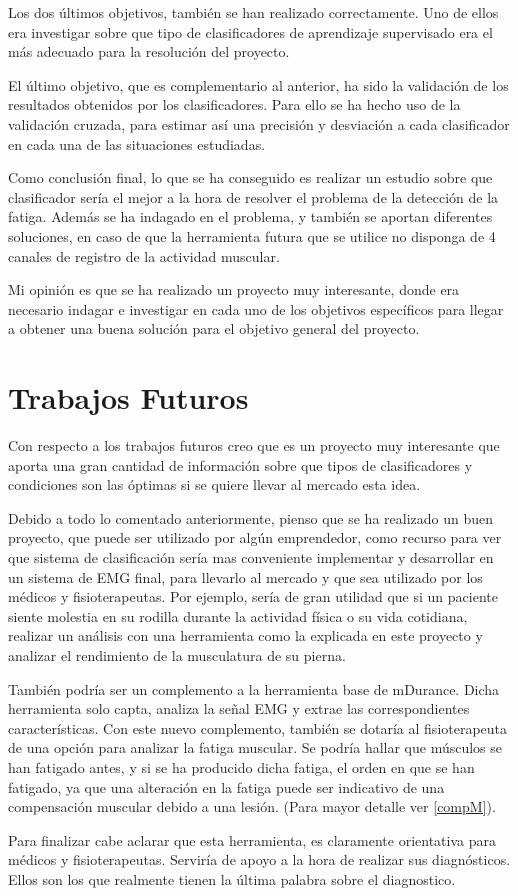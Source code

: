 Los dos últimos objetivos, también se han realizado correctamente. Uno de ellos era investigar sobre que tipo de clasificadores de aprendizaje supervisado era el más adecuado para la resolución del proyecto. 

El último objetivo, que es complementario al anterior, ha sido la validación de los resultados obtenidos por los clasificadores. Para ello se ha hecho uso de la validación cruzada, para estimar así una precisión y desviación a cada clasificador en cada una de las situaciones estudiadas.


Como conclusión final, lo que se ha conseguido es realizar un estudio sobre que clasificador sería el mejor a la hora de resolver el problema de la detección de la fatiga. Además se ha indagado en el problema, y también se aportan diferentes soluciones, en caso de que la herramienta futura que se utilice no disponga de 4 canales de registro de la actividad muscular. 


Mi opinión es que se ha realizado un proyecto muy interesante, donde era necesario indagar e investigar en cada uno de los objetivos específicos para llegar a obtener una buena solución para el objetivo general del proyecto.



\section{Trabajos Futuros}
Con respecto a los trabajos futuros creo que es un proyecto muy interesante que aporta una gran cantidad de información sobre que tipos de clasificadores y condiciones son las óptimas si se quiere llevar al mercado esta idea.

Debido a todo lo comentado anteriormente, pienso que se ha realizado un buen proyecto, que puede ser utilizado por algún emprendedor, como recurso para ver que sistema de clasificación sería mas conveniente implementar y desarrollar en un sistema de EMG final, para llevarlo al mercado y que sea utilizado por los médicos y fisioterapeutas. Por ejemplo, sería de gran utilidad que si un paciente siente molestia en su rodilla durante la actividad física o su vida cotidiana, realizar un análisis con una herramienta como la explicada en este proyecto y analizar el rendimiento de la musculatura de su pierna.

También podría ser un complemento a la herramienta base de mDurance. Dicha herramienta solo capta, analiza la señal EMG y extrae las correspondientes características. Con este nuevo complemento, también se dotaría al fisioterapeuta de una opción para analizar la fatiga muscular. Se podría hallar que músculos se han fatigado antes, y si se ha producido dicha fatiga, el orden en que se han fatigado, ya que una alteración en la fatiga puede ser indicativo de una compensación muscular debido a una lesión. (Para mayor detalle ver \ref{compM}).

Para finalizar cabe aclarar que esta herramienta, es claramente orientativa para médicos y fisioterapeutas. Serviría de apoyo a la hora de realizar sus diagnósticos. Ellos son los que realmente tienen la última palabra sobre el diagnostico.


